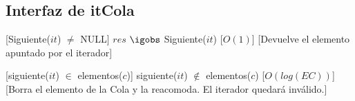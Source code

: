 \begin{Interfaz}
\subsection{Interfaz de itCola}

%
[Siguiente($it$) $\not=$ NULL]   %
{$res$ $\igobs$ Siguiente($it$)} %
[$O(1)$]   %
[Devuelve el elemento apuntado por el iterador]  %

[siguiente($it$) $\in$ elementos($c$)]
{siguiente($it$) $\not\in$ elementos($c$)}
[$O(log(EC))$]
[Borra el elemento de la Cola y la reacomoda. El iterador quedar\'a inv\'alido.]
\end{Interfaz}